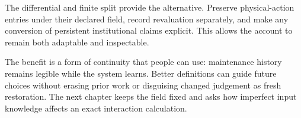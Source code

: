 The differential and finite split provide the alternative. Preserve physical-action entries under their declared field, record revaluation separately, and make any conversion of persistent institutional claims explicit. This allows the account to remain both adaptable and inspectable.

The benefit is a form of continuity that people can use: maintenance history remains legible while the system learns. Better definitions can guide future choices without erasing prior work or disguising changed judgement as fresh restoration. The next chapter keeps the field fixed and asks how imperfect input knowledge affects an exact interaction calculation.
